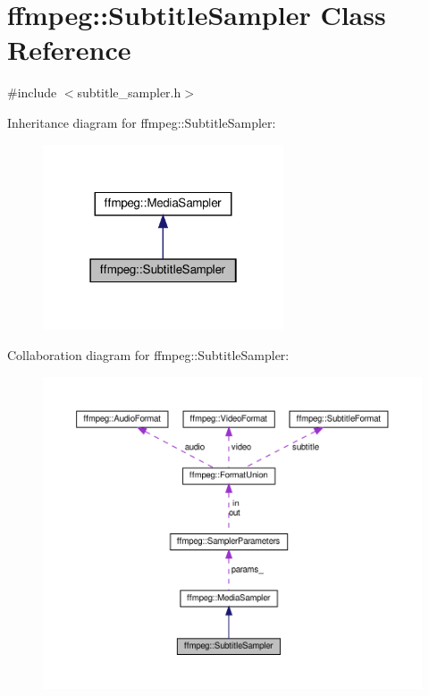 \hypertarget{classffmpeg_1_1SubtitleSampler}{}\section{ffmpeg\+:\+:Subtitle\+Sampler Class Reference}
\label{classffmpeg_1_1SubtitleSampler}


{\ttfamily \#include $<$subtitle\+\_\+sampler.\+h$>$}



Inheritance diagram for ffmpeg\+:\+:Subtitle\+Sampler\+:
\nopagebreak
\begin{figure}[H]
\begin{center}
\leavevmode
\includegraphics[width=202pt]{classffmpeg_1_1SubtitleSampler__inherit__graph}
\end{center}
\end{figure}


Collaboration diagram for ffmpeg\+:\+:Subtitle\+Sampler\+:
\nopagebreak
\begin{figure}[H]
\begin{center}
\leavevmode
\includegraphics[width=350pt]{classffmpeg_1_1SubtitleSampler__coll__graph}
\end{center}
\end{figure}
